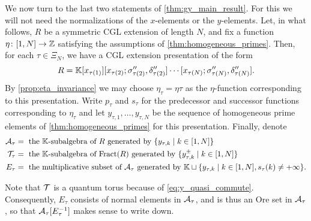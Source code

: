 \medskip

We now turn to the last two statements of \cref{thm:gy_main_result}. For this we will
not need the normalizations of the $x$-elements or the $y$-elements. Let, in what
follows, $R$ be a symmetric CGL extension of length $N$, and fix a function $\eta
	\colon [1, N] \to \mathbb{Z}$ satisfying the assumptions of \cref{thm:homogeneous_primes}.
Then, for each $\tau \in \Xi_N$, we have a CGL extension presentation of the form
\begin{equation*}
	R = \mathbb{K}[x_{\tau(1)}][x_{\tau(2)}; \sigma''_{\tau(2)}, \delta''_{\tau(2)}] \cdots [x_{\tau(N)}; \sigma''_{\tau(N)}, \delta''_{\tau(N)}].
\end{equation*}
%
By \cref{prop:eta_invariance} we may choose $\eta_\tau = \eta\tau$ as the
$\eta$-function corresponding to this presentation. Write $p_\tau$ and $s_\tau$ for the
predecessor and successor functions corresponding to $\eta_\tau$ and let $y_{\tau, 1},
	\dots, y_{\tau, N}$ be the sequence of homogeneous prime elements of
\cref{thm:homogeneous_primes} for this presentation. Finally, denote
\begin{align*}
	\mathcal{A}_\tau & = \text{ the $\mathbb{K}$-subalgebra of $R$ generated by } \{y_{\tau, k} \mid k \in [1, N]\}                                                   \\
	\mathcal{T}_\tau & = \text{ the $\mathbb{K}$-subalgebra of $\operatorname{Fract}(R)$ generated by } \{y_{\tau, k}^{\pm} \mid k \in [1, N]\}                                     \\
	E_\tau    & = \text{ the multiplicative subset of $\mathcal{A}_\tau$ generated by } \mathbb{K} \sqcup \{y_{\tau, k} \mid k \in [1, N], s_\tau(k) \neq + \infty\}.
\end{align*}

Note that $\mathcal{T}$ is a quantum torus because of \cref{eq:y_quasi_commute}. Consequently,
$E_\tau$ consists of normal elements in $\mathcal{A}_\tau$, and is thus an Ore set in
$\mathcal{A}_\tau$, so that $\mathcal{A}_\tau[E^{-1}_\tau]$ makes sense to write down.

